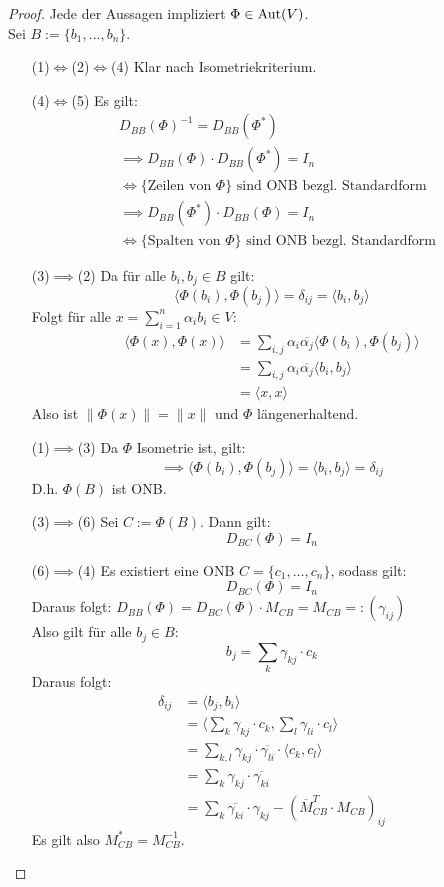 \documentclass[parskip,a4paper,twoside,DIV15,BCOR12mm]{scrbook}
\begin{document}
\begin{proof}
Jede der Aussagen impliziert $\Phi\in\operatorname{Aut}(V)$.\\
Sei $B:=\{b_1,\ldots,b_n\}$.
\begin{enumerate}
\item[(1)$\iff$(2)$\iff$(4)] Klar nach Isometriekriterium.
\item[(4)$\iff$(5)]Es gilt:
\begin{align*}
&D_{BB}(\Phi)^{-1} = D_{BB}(\Phi^*)\\
&	\implies D_{BB}(\Phi)\cdot D_{BB}(\Phi^*) = I_n\\
&\iff\{\text{Zeilen von }\Phi\}\text{ sind ONB bezgl. Standardform}\\
&\implies D_{BB}(\Phi^*)\cdot D_{BB}(\Phi) = I_n\\
&\iff\{\text{Spalten von }\Phi\}\text{ sind ONB bezgl. Standardform}
\end{align*}
\item[(3)$\implies$(2)]Da für alle $b_i,b_j\in B$ gilt:
\[\langle\Phi(b_i),\Phi(b_j)\rangle =\delta_{ij}=\langle b_i,b_j\rangle\]
Folgt für alle $x=\sum_{i=1}^n{\alpha_i b_i}\in V:$
\begin{align*}
\langle\Phi(x),\Phi(x)\rangle
&=\sum_{i,j}{\alpha_i\overline{\alpha_j}\langle\Phi(b_i),\Phi(b_j)\rangle}\\
&=\sum_{i,j}{\alpha_i\overline{\alpha_j}\langle b_i,b_j\rangle}\\
&=\langle x,x\rangle
\end{align*}
Also ist $\|\Phi(x)\|=\|x\|$ und $\Phi$ längenerhaltend.
\item[(1)$\implies$(3)] Da $\Phi$ Isometrie ist, gilt:
\[\implies \langle\Phi(b_i),\Phi(b_j)\rangle=\langle b_i,b_j\rangle =\delta_{ij}\]
D.h. $\Phi(B)$ ist ONB.
\item[(3)$\implies$(6)] Sei $C:=\Phi(B)$. Dann gilt:
\[D_{BC}(\Phi)=I_n\] 
\item[(6)$\implies$(4)]Es existiert eine ONB $C=\{c_1,\ldots,c_n\}$, sodass gilt:
\[D_{BC}(\Phi) = I_n\]
Daraus folgt: $D_{BB}(\Phi)=D_{BC}(\Phi)\cdot M_{CB}=M_{CB}=:(\gamma_{ij})$\\
Also gilt für alle $b_j\in B$:
\[b_j=\sum_k{\gamma_{kj}\cdot c_k}\]
Daraus folgt:
\begin{align*}
\delta_{ij}&=\langle b_j,b_i\rangle\\
&=\langle\sum_k{\gamma_{kj}\cdot c_k},\sum_l{\gamma_{li}\cdot c_l}\rangle\\
&=\sum_{k,l}{\gamma_{kj}\cdot\overline{\gamma_{li}}\cdot\langle c_k,c_l\rangle}\\
&=\sum_k{\gamma_{kj}\cdot\overline{\gamma_{ki}}}\\
&=\sum_k{\overline{\gamma_{ki}}\cdot\gamma_{kj}}-(\overline{M}_{CB}^T\cdot M_{CB})_{ij}
\end{align*}
Es gilt also $M_{CB}^* = M_{CB}^{-1}$.
\end{enumerate}
\end{proof}
\end{document}
